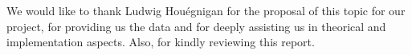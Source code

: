 We would like to thank Ludwig Houégnigan for the proposal of this topic for our project, for providing us the data and for deeply assisting us in theorical and implementation aspects. Also, for kindly reviewing this report.
